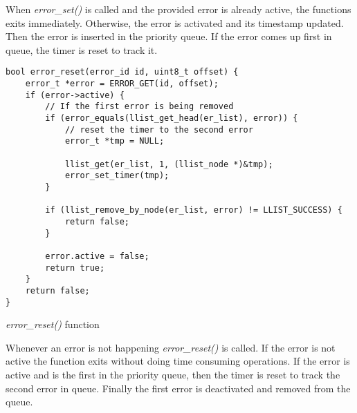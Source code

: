 When \textit{error\_set()} is called and the provided error is already active, the functions exits immediately. Otherwise, the error is activated and its timestamp updated. Then the error is inserted in the priority queue. If the error comes up first in queue, the timer is reset to track it.
\begin{listing}[h]
	\begin{verbatim}
bool error_reset(error_id id, uint8_t offset) {
	error_t *error = ERROR_GET(id, offset);
	if (error->active) {
		// If the first error is being removed
		if (error_equals(llist_get_head(er_list), error)) {
			// reset the timer to the second error
			error_t *tmp = NULL;
		
			llist_get(er_list, 1, (llist_node *)&tmp);
			error_set_timer(tmp);
		}
		
		if (llist_remove_by_node(er_list, error) != LLIST_SUCCESS) {
			return false;
		}
		
		error.active = false;
		return true;
	}
	return false;
}
	\end{verbatim}
	\caption{\textit{error\_reset()} function}
	\label{code:error_reset}
\end{listing}

Whenever an error is not happening \textit{error\_reset()} is called. If the error is not active the function exits without doing time consuming operations. If the error is active and is the first in the priority queue, then the timer is reset to track the second error in queue. Finally the first error is deactivated and removed from the queue.

